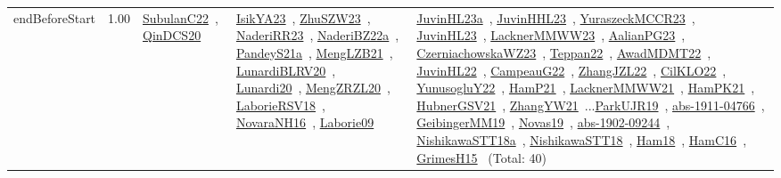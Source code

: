 {\begin{longtable}{p{3cm}r>{\raggedright\arraybackslash}p{6cm}>{\raggedright\arraybackslash}p{6cm}>{\raggedright\arraybackslash}p{8cm}}
\index{endBeforeStart}\index{Constraints!endBeforeStart}endBeforeStart &  1.00 & \href{../works/SubulanC22.pdf}{SubulanC22}~\cite{SubulanC22}, \href{../works/QinDCS20.pdf}{QinDCS20}~\cite{QinDCS20} & \href{../works/IsikYA23.pdf}{IsikYA23}~\cite{IsikYA23}, \href{../works/ZhuSZW23.pdf}{ZhuSZW23}~\cite{ZhuSZW23}, \href{../works/NaderiRR23.pdf}{NaderiRR23}~\cite{NaderiRR23}, \href{../works/NaderiBZ22a.pdf}{NaderiBZ22a}~\cite{NaderiBZ22a}, \href{../works/PandeyS21a.pdf}{PandeyS21a}~\cite{PandeyS21a}, \href{../works/MengLZB21.pdf}{MengLZB21}~\cite{MengLZB21}, \href{../works/LunardiBLRV20.pdf}{LunardiBLRV20}~\cite{LunardiBLRV20}, \href{../works/Lunardi20.pdf}{Lunardi20}~\cite{Lunardi20}, \href{../works/MengZRZL20.pdf}{MengZRZL20}~\cite{MengZRZL20}, \href{../works/LaborieRSV18.pdf}{LaborieRSV18}~\cite{LaborieRSV18}, \href{../works/NovaraNH16.pdf}{NovaraNH16}~\cite{NovaraNH16}, \href{../works/Laborie09.pdf}{Laborie09}~\cite{Laborie09} & \href{../works/JuvinHL23a.pdf}{JuvinHL23a}~\cite{JuvinHL23a}, \href{../works/JuvinHHL23.pdf}{JuvinHHL23}~\cite{JuvinHHL23}, \href{../works/YuraszeckMCCR23.pdf}{YuraszeckMCCR23}~\cite{YuraszeckMCCR23}, \href{../works/JuvinHL23.pdf}{JuvinHL23}~\cite{JuvinHL23}, \href{../works/LacknerMMWW23.pdf}{LacknerMMWW23}~\cite{LacknerMMWW23}, \href{../works/AalianPG23.pdf}{AalianPG23}~\cite{AalianPG23}, \href{../works/CzerniachowskaWZ23.pdf}{CzerniachowskaWZ23}~\cite{CzerniachowskaWZ23}, \href{../works/Teppan22.pdf}{Teppan22}~\cite{Teppan22}, \href{../works/AwadMDMT22.pdf}{AwadMDMT22}~\cite{AwadMDMT22}, \href{../works/JuvinHL22.pdf}{JuvinHL22}~\cite{JuvinHL22}, \href{../works/CampeauG22.pdf}{CampeauG22}~\cite{CampeauG22}, \href{../works/ZhangJZL22.pdf}{ZhangJZL22}~\cite{ZhangJZL22}, \href{../works/CilKLO22.pdf}{CilKLO22}~\cite{CilKLO22}, \href{../works/YunusogluY22.pdf}{YunusogluY22}~\cite{YunusogluY22}, \href{../works/HamP21.pdf}{HamP21}~\cite{HamP21}, \href{../works/LacknerMMWW21.pdf}{LacknerMMWW21}~\cite{LacknerMMWW21}, \href{../works/HamPK21.pdf}{HamPK21}~\cite{HamPK21}, \href{../works/HubnerGSV21.pdf}{HubnerGSV21}~\cite{HubnerGSV21}, \href{../works/ZhangYW21.pdf}{ZhangYW21}~\cite{ZhangYW21}...\href{../works/ParkUJR19.pdf}{ParkUJR19}~\cite{ParkUJR19}, \href{../works/abs-1911-04766.pdf}{abs-1911-04766}~\cite{abs-1911-04766}, \href{../works/GeibingerMM19.pdf}{GeibingerMM19}~\cite{GeibingerMM19}, \href{../works/Novas19.pdf}{Novas19}~\cite{Novas19}, \href{../works/abs-1902-09244.pdf}{abs-1902-09244}~\cite{abs-1902-09244}, \href{../works/NishikawaSTT18a.pdf}{NishikawaSTT18a}~\cite{NishikawaSTT18a}, \href{../works/NishikawaSTT18.pdf}{NishikawaSTT18}~\cite{NishikawaSTT18}, \href{../works/Ham18.pdf}{Ham18}~\cite{Ham18}, \href{../works/HamC16.pdf}{HamC16}~\cite{HamC16}, \href{../works/GrimesH15.pdf}{GrimesH15}~\cite{GrimesH15} (Total: 40)\\

\end{longtable}}
